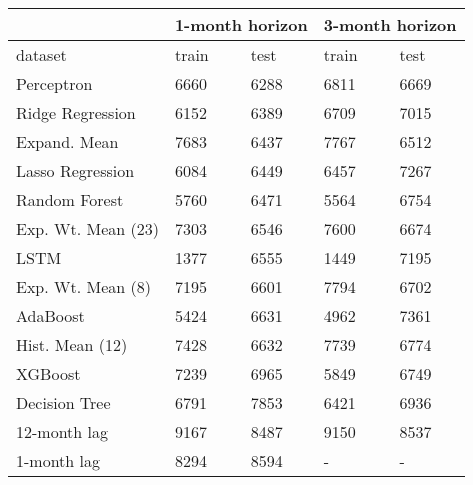 \begin{tabular}{lllll}
\toprule
{} & \multicolumn{2}{l}{1-month horizon} & \multicolumn{2}{l}{3-month horizon} \\
\midrule
dataset            &           train &  test &           train &  test \\
Perceptron         &            6660 &  6288 &            6811 &  6669 \\
Ridge Regression   &            6152 &  6389 &            6709 &  7015 \\
Expand. Mean       &            7683 &  6437 &            7767 &  6512 \\
Lasso Regression   &            6084 &  6449 &            6457 &  7267 \\
Random Forest      &            5760 &  6471 &            5564 &  6754 \\
Exp. Wt. Mean (23) &            7303 &  6546 &            7600 &  6674 \\
LSTM               &            1377 &  6555 &            1449 &  7195 \\
Exp. Wt. Mean (8)  &            7195 &  6601 &            7794 &  6702 \\
AdaBoost           &            5424 &  6631 &            4962 &  7361 \\
Hist. Mean (12)    &            7428 &  6632 &            7739 &  6774 \\
XGBoost            &            7239 &  6965 &            5849 &  6749 \\
Decision Tree      &            6791 &  7853 &            6421 &  6936 \\
12-month lag       &            9167 &  8487 &            9150 &  8537 \\
1-month lag        &            8294 &  8594 &               - &     - \\
\bottomrule
\end{tabular}
